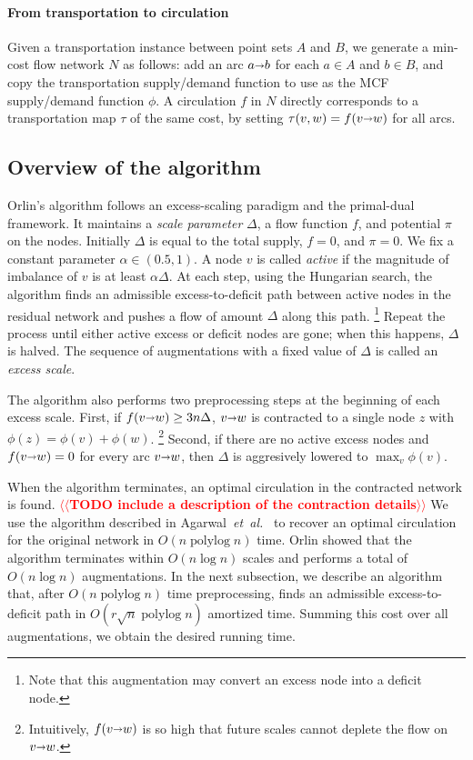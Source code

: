 \documentclass[11pt]{article}
\makeatletter
\def\etal{\emph{et~al.}}
\def\etal{\textit{et~al.}}
\def\polylog{\mathop{\mathrm{polylog}}}
\def\fsupply{\phi}
\def\arcto{\mathord\shortrightarrow}
\def\arc#1#2{#1\arcto#2}
\numberwithin{figure}{section}
\def\EMPH#1{\textcolor{BrickRed}{{\emph{#1}}}}
\def\n@te#1{\textsf{\boldmath \textbf{$\langle\!\langle$#1$\rangle\!\rangle$}}\leavevmode}
\def\note#1{\textcolor{red}{\n@te{#1}}}
\makeatother
\begin{document}
\paragraph*{From transportation to circulation}
Given a transportation instance between point sets $A$ and $B$, we generate a
min-cost flow network $N$ as follows: add an arc $\arc ab$ for each $a \in A$ and $b \in B$,
and copy the transportation supply/demand function to use as the MCF supply/demand function $\fsupply$.
A circulation $f$ in $N$ directly corresponds to a transportation map $\tau$
of the same cost, by setting $\tau(v, w) = f(\arc vw)$ for all arcs.

\subsection{Overview of the algorithm}

Orlin's algorithm follows an excess-scaling paradigm and the primal-dual framework.
It maintains a \EMPH{scale parameter} $\Delta$, a flow function $f$, and
potential $\pi$ on the nodes.
Initially $\Delta$ is equal to the total supply, $f = 0$, and $\pi = 0$.
We fix a constant parameter $\alpha \in (0.5, 1)$.
A node $v$ is called \EMPH{active} if the magnitude of imbalance of $v$ is at least $\alpha\Delta$.
At each step, using the Hungarian search, the algorithm finds an admissible
excess-to-deficit path between active nodes in the residual network and pushes a flow
of amount $\Delta$ along this path.%
\footnote{Note that this augmentation may convert an excess node into a deficit node.}
Repeat the process until either active excess or deficit nodes are gone; when this happens, $\Delta$ is halved.
The sequence of augmentations with a fixed value of $\Delta$ is called an
\EMPH{excess scale}.

The algorithm also performs two preprocessing steps at the beginning of each excess scale.
First, if $f(\arc vw) \geq 3n\Delta$, $\arc vw$ is contracted to a single node $z$ with
$\fsupply(z) = \fsupply(v) + \fsupply(w)$.%
\footnote{Intuitively, $f(\arc vw)$ is so high that future scales cannot deplete
the flow on $\arc vw$.}
Second, if there are no active excess nodes and $f(\arc vw) = 0$ for every arc $\arc vw$, then $\Delta$
is aggresively lowered to $\max_v \fsupply(v)$.

When the algorithm terminates, an optimal circulation in the
contracted network is found.
\note{TODO include a description of the contraction details}
We use the algorithm described in Agarwal~\etal~\cite{AFPVX17arxiv} to recover
an optimal circulation for the original network in $O(n\polylog n)$ time.
Orlin showed that the algorithm terminates within $O(n\log n)$ scales and
performs a total of $O(n\log n)$ augmentations.
In the next subsection, we describe an algorithm that, after $O(n\polylog n)$ time
preprocessing,
finds an admissible excess-to-deficit path
in $O(r\sqrt{n} \polylog n)$ amortized time.
Summing this cost over all augmentations, we obtain the desired running time.
\end{document}
